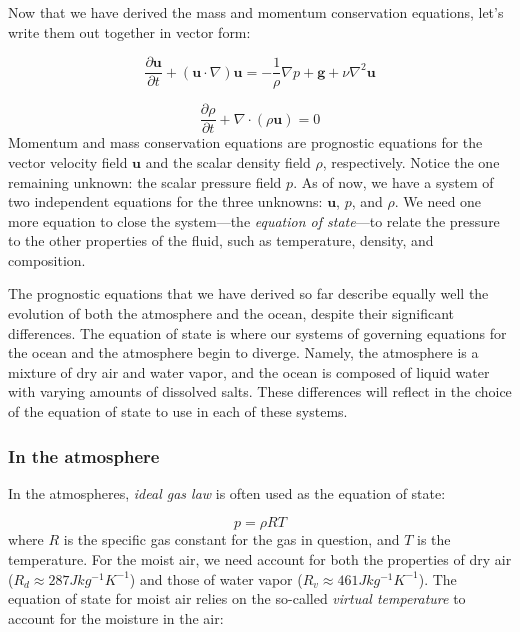 \documentclass[12pt]{article}
\numberwithin{equation}{section}
\numberwithin{figure}{section}
\numberwithin{table}{section}
\begin{document}
Now that we have derived the mass and momentum conservation equations, let's
write them out together in vector form:

\begin{equation}
  \frac{\partial \mathbf{u}}{\partial t} + (\mathbf{u} \cdot \nabla) \mathbf{u} =
  - \frac{1}{\rho} \nabla p + \mathbf{g} + \nu \nabla^2 \mathbf{u}
  \label{eq:momentum_navier_stokes_state}
\end{equation}

\begin{equation}
  \frac{\partial \rho}{\partial t} + \nabla \cdot (\rho \mathbf{u}) = 0
  \label{eq:continuity_eulerian_state}
\end{equation}
Momentum and mass conservation equations are prognostic equations for the
vector velocity field $\mathbf{u}$ and the scalar density field $\rho$,
respectively.
Notice the one remaining unknown: the scalar pressure field $p$.
As of now, we have a system of two independent equations for the three unknowns:
$\mathbf{u}$, $p$, and $\rho$.
We need one more equation to close the system---the
\textit{equation of state}---to relate the pressure to
the other properties of the fluid, such as temperature, density, and
composition.

The prognostic equations that we have derived so far describe equally well
the evolution of both the atmosphere and the ocean, despite their significant
differences.
The equation of state is where our systems of governing equations for the ocean
and the atmosphere begin to diverge.
Namely, the atmosphere is a mixture of dry air and water vapor, and the
ocean is composed of liquid water with varying amounts of dissolved salts.
These differences will reflect in the choice of the equation of state to use
in each of these systems.

\subsubsection{In the atmosphere}

In the atmospheres, \textit{ideal gas law}
is often used as the equation of state:

\begin{equation}
  p = \rho R T
  \label{eq:ideal_gas_law}
\end{equation}
where $R$ is the specific gas constant for the gas in question, and $T$ is the
temperature.
For the moist air, we need account for both the properties of dry air
($R_d \approx 287 J kg^{-1} K^{-1}$) and those of water vapor
($R_v \approx 461 J kg^{-1} K^{-1}$).
The equation of state for moist air relies on the so-called
\textit{virtual temperature} to account for the
moisture in the air:
\end{document}
